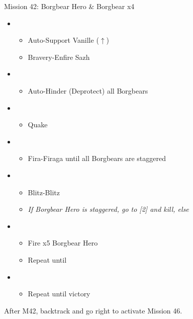\begin{battle}{Mission 42: Borgbear Hero \& Borgbear x4}
	\begin{itemize}
		\item \third
			\begin{itemize}
				\item Auto-Support Vanille ($\uparrow$)
				\item Bravery-Enfire Sazh
			\end{itemize}
		\item \fifth
			\begin{itemize}
				\item Auto-Hinder (Deprotect) all Borgbears
			\end{itemize}
		\item \first
			\begin{itemize}
				\item Quake
			\end{itemize}
		\item \sixth
			\begin{itemize}
				\item Fira-Firaga until all Borgbears are staggered
			\end{itemize}
		\item \first
			\begin{itemize}
				\item Blitz-Blitz
				\item \textit{If Borgbear Hero is staggered, go to [2] and kill, else}
			\end{itemize}	
		\item \sixth
			\begin{itemize}
				\item Fire x5 Borgbear Hero
				\item Repeat until \stagger
			\end{itemize}	
		\item \second
			\begin{itemize}
				\item Repeat until victory
			\end{itemize}																			
	\end{itemize}
\end{battle}

After M42, backtrack and go right to activate Mission 46.

